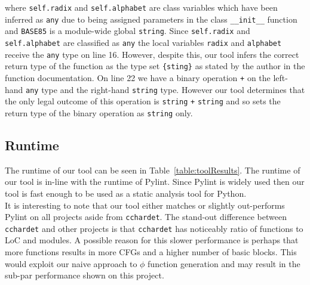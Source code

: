 \documentclass[12pt, titlepage]{article}
\begin{document}
where \texttt{self.radix} and \texttt{self.alphabet} are class variables which have been inferred as \texttt{any} due to being assigned parameters in the class \texttt{\_\_init\_\_} function and \texttt{BASE85} is a module-wide global \texttt{string}. Since \texttt{self.radix} and \texttt{self.alphabet} are classified as \texttt{any} the local variables \texttt{radix} and \texttt{alphabet} receive the \texttt{any} type on line 16. However, despite this, our tool infers the correct return type of the function as the type set \texttt{\{sting\}} as stated by the author in the function documentation. On line 22 we have a binary operation \texttt{+} on the left-hand \texttt{any} type and the right-hand \texttt{string} type. However our tool determines that the only legal outcome of this operation is \texttt{string} \texttt{+} \texttt{string} and so sets the return type of the binary operation as \texttt{string} only.

\subsection{Runtime}
The runtime of our tool can be seen in Table~\ref{table:toolResults}. The runtime of our tool is in-line with the runtime of Pylint. Since Pylint is widely used then our tool is fast enough to be used as a static analysis tool for Python. \\
\indent It is interesting to note that our tool either matches or slightly out-performs Pylint on all projects aside from \texttt{cchardet}. The stand-out difference between \texttt{cchardet} and other projects is that \texttt{cchardet} has noticeably ratio of functions to LoC and modules. A possible reason for this slower performance is perhaps that more functions results in more CFGs and a higher number of basic blocks. This would exploit our naive approach to $\phi$ function generation and may result in the sub-par performance shown on this project.
\end{document}
